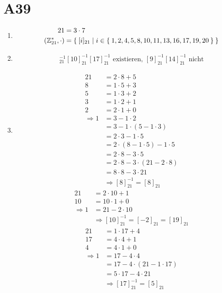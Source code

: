 \documentclass[fleqn,12pt]{scrartcl}
\begin{document}
\section*{A39}
\begin{enumerate}
	\item
		\begin{align*}
			21 &= 3 \cdot 7 \\
			\left(\mathbb{Z}_{21}^*, \cdot \right) &= \Set{[i]_{21}| i\in \Set{1,2,4,5,8,10,11,13,16,17,19,20}   }
		\end{align*}

	\item
		\begin{align*}
			[8]_{21}^{-1}
			[10]_{21}^{-1}
			[17]_{21}^{-1}
			\text{ existieren, }
			[9]_{21}^{-1}
			[14]_{21}^{-1}
			\text{ nicht}
		\end{align*}
		
	\item
		\begin{align*}
			21 &= 2 \cdot 8 + 5 \\
			8 &= 1 \cdot 5 + 3 \\
			5 &= 1 \cdot 3 + 2 \\
			3 &= 1 \cdot 2 + 1 \\
			2 &= 2 \cdot 1 + 0 \\
			\Rightarrow 1 &= 3 - 1 \cdot 2\\
				&= 3 - 1 \cdot (5 - 1 \cdot 3)\\
			 &= 2 \cdot 3 - 1 \cdot  5 \\ 
			 &= 2 \cdot (8 - 1 \cdot 5) - 1 \cdot 5 \\
			 &= 2 \cdot 8 - 3 \cdot 5\\
			 &= 2 \cdot 8 - 3 \cdot (21 - 2 \cdot 8 )\\
			 &= 8 \cdot 8 - 3 \cdot 21\\
			&\Rightarrow [8]_{21}^{-1} = [8]_{21}
		\end{align*}
		\begin{align*}
			21 &= 2 \cdot 10 + 1\\
			10 &= 10 \cdot 1 + 0\\
			\Rightarrow 1 &= 21 - 2 \cdot 10 \\
																 &\Rightarrow [10]_{21}^{-1} = [-2]_{21} = [19]_{21}
		\end{align*}
		\begin{align*}
			21 &= 1 \cdot 17 + 4\\
			17 &= 4 \cdot 4 + 1 \\
			4 &= 4 \cdot 1 + 0\\
			\Rightarrow 1 &= 17 - 4\cdot 4\\
																&=17 - 4 \cdot (21 - 1 \cdot 17) \\
									 &= 5 \cdot 17 - 4 \cdot 21\\
									 &\Rightarrow [17]_{21}^{-1} = [5]_{21}
		\end{align*}
\end{enumerate}
\end{document}
